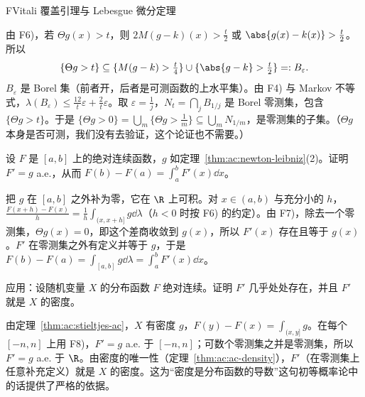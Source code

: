\begin{probleme}{F}{Vitali 覆盖引理与 Lebesgue 微分定理}
\begin{questions}
\begin{solution}
由 F6)，若 $\Theta g(x)>t$，则 $2M(g-k)(x)>\frac t2$ 或 $\abs{g(x)-k(x)}>\frac t2$。所以
\[
\{\Theta g>t\}\subseteq\{M(g-k)>\tfrac t4\}\cup\{\abs{g-k}>\tfrac t2\}=:B_\varepsilon .
\]
$B_\varepsilon$ 是 Borel 集（前者开，后者是可测函数的上水平集）。由 F4) 与 Markov 不等式，$\lambda(B_\varepsilon)\leqslant\frac{12}t\varepsilon+\frac2t\varepsilon$。取 $\varepsilon=\frac1j$，$N_t=\bigcap_jB_{1/j}$ 是 Borel 零测集，包含 $\{\Theta g>t\}$。于是 $\{\Theta g>0\}=\bigcup_m\{\Theta g>\frac1m\}\subseteq\bigcup_mN_{1/m}$，是零测集的子集。（$\Theta g$ 本身是否可测，我们没有去验证，这个论证也不需要。）
\end{solution}
\item 设 $F$ 是 $[a,b]$ 上的绝对连续函数，$g$ 如定理~\ref{thm:ac:newton-leibniz}(2)。证明 $F'=g$ a.e.，从而 $F(b)-F(a)=\int_a^bF'(x)\dd x$。
\begin{solution}
把 $g$ 在 $[a,b]$ 之外补为零，它在 $\R$ 上可积。对 $x\in(a,b)$ 与充分小的 $h$，$\frac{F(x+h)-F(x)}h=\frac1h\int_{(x,x+h]}g\dd\lambda$（$h<0$ 时按 F6) 的约定）。由 F7)，除去一个零测集，$\Theta g(x)=0$，即这个差商收敛到 $g(x)$，所以 $F'(x)$ 存在且等于 $g(x)$。$F'$ 在零测集之外有定义并等于 $g$，于是 $F(b)-F(a)=\int_{[a,b]}g\dd\lambda=\int_a^bF'(x)\dd x$。
\end{solution}
\item 应用：设随机变量 $X$ 的分布函数 $F$ 绝对连续。证明 $F'$ 几乎处处存在，并且 $F'$ 就是 $X$ 的密度。
\begin{solution}
由定理~\ref{thm:ac:stieltjes-ac}，$X$ 有密度 $g$，$F(y)-F(x)=\int_{(x,y]}g$。在每个 $[-n,n]$ 上用 F8)，$F'=g$ a.e. 于 $[-n,n]$；可数个零测集之并是零测集，所以 $F'=g$ a.e. 于 $\R$。由密度的唯一性（定理~\ref{thm:ac:ac-density}），$F'$（在零测集上任意补充定义）就是 $X$ 的密度。这为“密度是分布函数的导数”这句初等概率论中的话提供了严格的依据。
\end{solution}
\end{questions}
\end{probleme}
